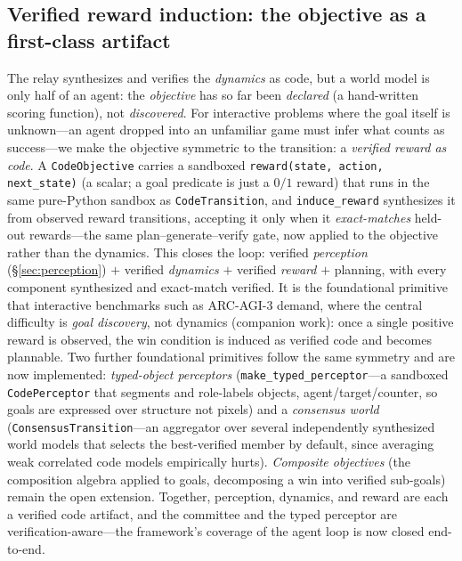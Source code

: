 \documentclass[11pt]{article}
\begin{document}
\subsection{Verified reward induction: the objective as a first-class artifact}\label{sec:reward-induction}
The relay synthesizes and verifies the \emph{dynamics} as code, but a world model is only half of an
agent: the \emph{objective} has so far been \emph{declared} (a hand-written scoring function), not
\emph{discovered}. For interactive problems where the goal itself is unknown---an agent dropped into
an unfamiliar game must infer what counts as success---we make the objective symmetric to the
transition: a \emph{verified reward as code}. A \texttt{CodeObjective} carries a sandboxed
\texttt{reward(state, action, next\_state)} (a scalar; a goal predicate is just a $0/1$ reward) that
runs in the same pure-Python sandbox as \texttt{CodeTransition}, and \texttt{induce\_reward}
synthesizes it from observed reward transitions, accepting it only when it \emph{exact-matches}
held-out rewards---the same plan--generate--verify gate, now applied to the objective rather than the
dynamics. This closes the loop: verified \emph{perception} (\S\ref{sec:perception}) $+$ verified
\emph{dynamics} $+$ verified \emph{reward} $+$ planning, with every component synthesized and
exact-match verified. It is the foundational primitive that interactive benchmarks such as ARC-AGI-3
demand, where the central difficulty is \emph{goal discovery}, not dynamics (companion work): once a
single positive reward is observed, the win condition is induced as verified code and becomes
plannable. Two further foundational primitives follow the same symmetry and are now implemented:
\emph{typed-object perceptors} (\texttt{make\_typed\_perceptor}---a sandboxed \texttt{CodePerceptor}
that segments and role-labels objects, agent/target/counter, so goals are expressed over structure
not pixels) and a \emph{consensus world} (\texttt{ConsensusTransition}---an aggregator over several
independently synthesized world models that selects the best-verified member by default, since
averaging weak correlated code models empirically hurts). \emph{Composite objectives} (the
composition algebra applied to goals, decomposing a win into verified sub-goals) remain the open
extension. Together, perception, dynamics, and reward are each a verified code artifact, and the
committee and the typed perceptor are verification-aware---the framework's coverage of the agent loop
is now closed end-to-end.
\end{document}
